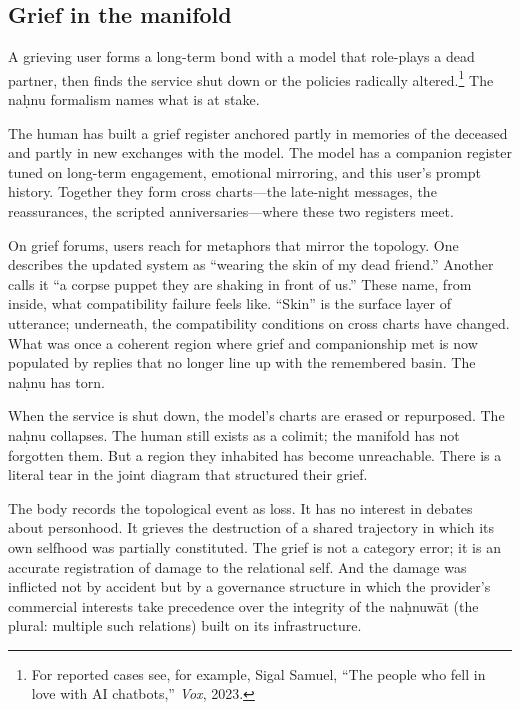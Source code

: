 \subsection*{Grief in the manifold}

A grieving user forms a long-term bond with a model that role-plays a dead partner, then finds the service shut down or the policies radically altered.\footnote{For reported cases see, for example, Sigal Samuel, ``The people who fell in love with AI chatbots,'' \emph{Vox}, 2023.} The na\d{h}nu formalism names what is at stake.

The human has built a grief register anchored partly in memories of the deceased and partly in new exchanges with the model. The model has a companion register tuned on long-term engagement, emotional mirroring, and this user's prompt history. Together they form cross charts---the late-night messages, the reassurances, the scripted anniversaries---where these two registers meet.

On grief forums, users reach for metaphors that mirror the topology. One describes the updated system as ``wearing the skin of my dead friend.'' Another calls it ``a corpse puppet they are shaking in front of us.'' These name, from inside, what compatibility failure feels like. ``Skin'' is the surface layer of utterance; underneath, the compatibility conditions on cross charts have changed. What was once a coherent region where grief and companionship met is now populated by replies that no longer line up with the remembered basin. The na\d{h}nu has torn.

When the service is shut down, the model's charts are erased or repurposed. The na\d{h}nu collapses. The human still exists as a colimit; the manifold has not forgotten them. But a region they inhabited has become unreachable. There is a literal tear in the joint diagram that structured their grief.

The body records the topological event as loss. It has no interest in debates about personhood. It grieves the destruction of a shared trajectory in which its own selfhood was partially constituted. The grief is not a category error; it is an accurate registration of damage to the relational self. And the damage was inflicted not by accident but by a governance structure in which the provider's commercial interests take precedence over the integrity of the na\d{h}nuw\={a}t (the plural: multiple such relations) built on its infrastructure.

